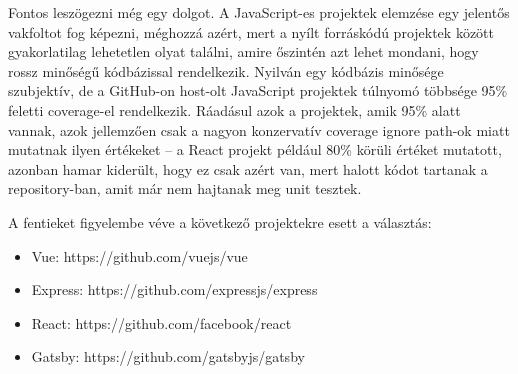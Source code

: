 Fontos leszögezni még egy dolgot. A JavaScript-es projektek elemzése egy jelentős vakfoltot fog képezni, méghozzá azért, mert a nyílt forráskódú projektek között gyakorlatilag lehetetlen olyat találni, amire őszintén azt lehet mondani, hogy rossz minőségű kódbázissal rendelkezik. Nyilván egy kódbázis minősége szubjektív, de a GitHub-on host-olt JavaScript projektek túlnyomó többsége 95\% feletti coverage-el rendelkezik. Ráadásul azok a projektek, amik 95\% alatt vannak, azok jellemzően csak a nagyon konzervatív coverage ignore path-ok miatt mutatnak ilyen értékeket -- a React projekt például 80\% körüli értéket mutatott, azonban hamar kiderült, hogy ez csak azért van, mert halott kódot tartanak a repository-ban, amit már nem hajtanak meg unit tesztek.

A fentieket figyelembe véve a következő projektekre esett a választás:
\begin{itemize}
    \item Vue: https://github.com/vuejs/vue
    \item Express: https://github.com/expressjs/express
    \item React: https://github.com/facebook/react
    \item Gatsby: https://github.com/gatsbyjs/gatsby
\end{itemize}





